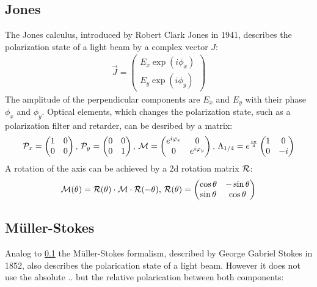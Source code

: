 \subsection{Jones}
\label{sec:jones}
% 
The Jones calculus, introduced by Robert Clark Jones in 1941, describes the polarization state of a light beam by a complex vector $J$:
% 
\begin{align}
    \vec{J} = \begin{pmatrix} E_x \exp(i \phi_x) \\ E_y \exp(i \phi_y) \end{pmatrix}
\end{align}
% 
The amplitude of the perpendicular components are $E_x$ and $E_y$ with their phase $\phi_x$ and $\phi_y$.
Optical elements, which changes the polarization state, such as a polarization filter and retarder, can be desribed by a matrix:
% 
\begin{align}
\begin{split}
\mathcal{P}_x = 
\begin{pmatrix}
1 & 0 \\ 0 & 0
\end{pmatrix}
, \,
\mathcal{P}_y = 
\begin{pmatrix}
0 & 0 \\ 0 & 1
\end{pmatrix}
, \,
\mathcal{M} =
\begin{pmatrix}
e^{i \varphi_x} & 0 \\ 0 & e^{i \varphi_y}
\end{pmatrix}
, \,
\Lambda_{1/4}=
e^{\frac{i \pi}{4}}
\begin{pmatrix}
1 & 0 \\ 0 & -i
\end{pmatrix}
\end{split}
\end{align}
% 
A rotation of the axis can be achieved by a 2d rotation matrix $\mathcal{R}$:
% 
\begin{align}
\begin{split}
\mathcal{M}(\theta )=\mathcal{R}(\theta )\cdot\mathcal{M}\cdot\mathcal{R}(-\theta )
, \,
\mathcal{R}(\theta ) = 
\begin{pmatrix}
\cos \theta & -\sin \theta \\
\sin \theta & \cos \theta
\end{pmatrix}
\end{split}
\end{align}
% 
% 
% 
\subsection{M\"uller-Stokes}\label{sec:Mueller-Stokes}
\label{sec:mueller_stokes}
% 
Analog to \cref{sec:jones} the M\"uller-Stokes formalism, described by George Gabriel Stokes in 1852, also describes the polarication state of a light beam.
However it does not use the absolute .. but the relative polarication between both components:
% 
